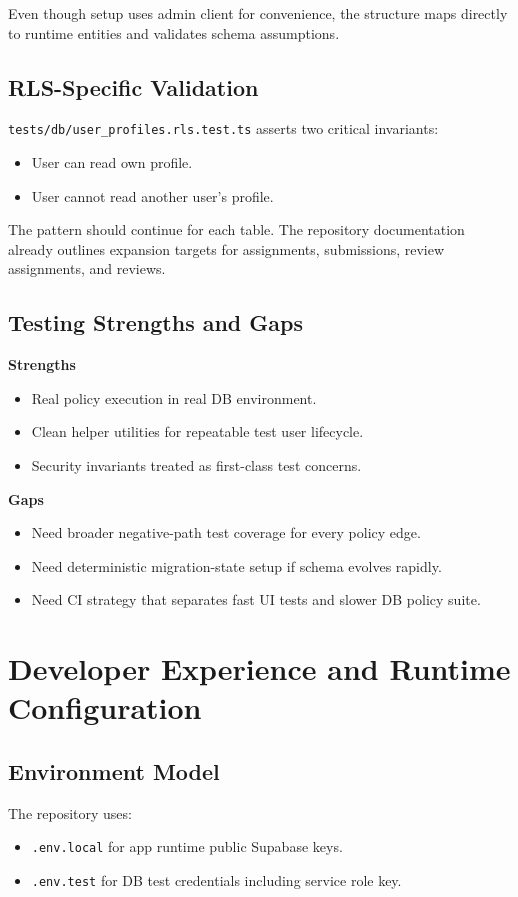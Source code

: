 \documentclass[11pt]{article}
\begin{document}
Even though setup uses admin client for convenience, the structure maps directly to runtime entities and validates schema assumptions.

\subsection{RLS-Specific Validation}
\texttt{tests/db/user\_profiles.rls.test.ts} asserts two critical invariants:
\begin{itemize}[leftmargin=*]
  \item User can read own profile.
  \item User cannot read another user's profile.
\end{itemize}

The pattern should continue for each table. The repository documentation already outlines expansion targets for assignments, submissions, review assignments, and reviews.

\subsection{Testing Strengths and Gaps}
\textbf{Strengths}
\begin{itemize}[leftmargin=*]
  \item Real policy execution in real DB environment.
  \item Clean helper utilities for repeatable test user lifecycle.
  \item Security invariants treated as first-class test concerns.
\end{itemize}

\textbf{Gaps}
\begin{itemize}[leftmargin=*]
  \item Need broader negative-path test coverage for every policy edge.
  \item Need deterministic migration-state setup if schema evolves rapidly.
  \item Need CI strategy that separates fast UI tests and slower DB policy suite.
\end{itemize}

\section{Developer Experience and Runtime Configuration}
\subsection{Environment Model}
The repository uses:
\begin{itemize}[leftmargin=*]
  \item \texttt{.env.local} for app runtime public Supabase keys.
  \item \texttt{.env.test} for DB test credentials including service role key.
\end{itemize}
\end{document}
